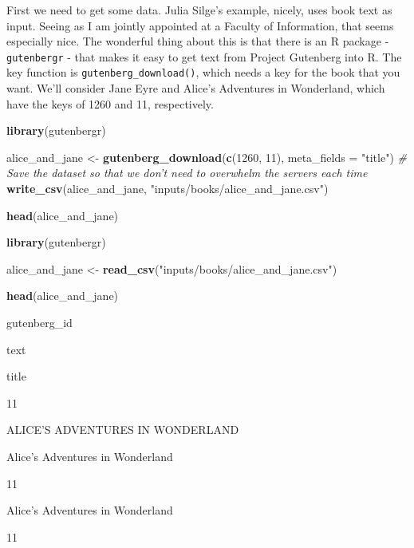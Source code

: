 \documentclass[
]{book}
\newenvironment{Shaded}{\begin{snugshade}}{\end{snugshade}}
\newcommand{\CommentTok}[1]{\textcolor[rgb]{0.56,0.35,0.01}{\textit{#1}}}
\newcommand{\DataTypeTok}[1]{\textcolor[rgb]{0.13,0.29,0.53}{#1}}
\newcommand{\DecValTok}[1]{\textcolor[rgb]{0.00,0.00,0.81}{#1}}
\newcommand{\KeywordTok}[1]{\textcolor[rgb]{0.13,0.29,0.53}{\textbf{#1}}}
\newcommand{\NormalTok}[1]{#1}
\newcommand{\StringTok}[1]{\textcolor[rgb]{0.31,0.60,0.02}{#1}}
\begin{document}
First we need to get some data. Julia Silge's example, nicely, uses book text as input. Seeing as I am jointly appointed at a Faculty of Information, that seems especially nice. The wonderful thing about this is that there is an R package - \texttt{gutenbergr} - that makes it easy to get text from Project Gutenberg into R. The key function is \texttt{gutenberg\_download()}, which needs a key for the book that you want. We'll consider Jane Eyre and Alice's Adventures in Wonderland, which have the keys of 1260 and 11, respectively.

\begin{Shaded}
\begin{Highlighting}[]
\KeywordTok{library}\NormalTok{(gutenbergr)}

\NormalTok{alice_and_jane <-}\StringTok{ }\KeywordTok{gutenberg_download}\NormalTok{(}\KeywordTok{c}\NormalTok{(}\DecValTok{1260}\NormalTok{, }\DecValTok{11}\NormalTok{), }\DataTypeTok{meta_fields =} \StringTok{"title"}\NormalTok{)}
\CommentTok{# Save the dataset so that we don't need to overwhelm the servers each time}
\KeywordTok{write_csv}\NormalTok{(alice_and_jane, }\StringTok{"inputs/books/alice_and_jane.csv"}\NormalTok{)}

\KeywordTok{head}\NormalTok{(alice_and_jane)}
\end{Highlighting}
\end{Shaded}

\begin{Shaded}
\begin{Highlighting}[]
\KeywordTok{library}\NormalTok{(gutenbergr)}

\NormalTok{alice_and_jane <-}\StringTok{ }\KeywordTok{read_csv}\NormalTok{(}\StringTok{"inputs/books/alice_and_jane.csv"}\NormalTok{)}

\KeywordTok{head}\NormalTok{(alice_and_jane)}
\end{Highlighting}
\end{Shaded}

\label{tab:unnamed-chunk-399}

gutenberg\_id

text

title

11

ALICE'S ADVENTURES IN WONDERLAND

Alice's Adventures in Wonderland

11

Alice's Adventures in Wonderland

11
\end{document}
